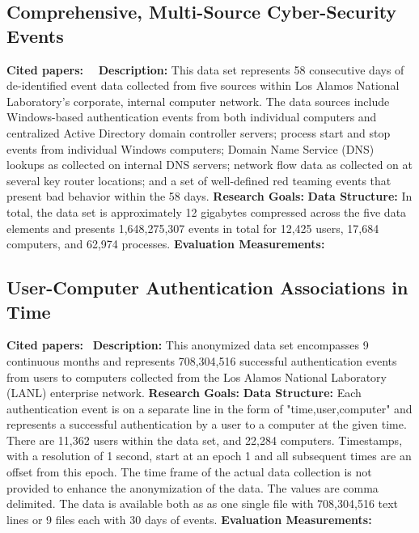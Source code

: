 \subsection{Comprehensive, Multi-Source Cyber-Security Events}
\textbf{Cited papers:}~\cite{akent-2015-enterprise-data}~\cite{pritom2017study} \newline
\textbf{Description:} This data set represents 58 consecutive days of de-identified event data collected from five sources within Los Alamos National Laboratory's corporate, internal computer network. The data sources include Windows-based authentication events from both individual computers and centralized Active Directory domain controller servers; process start and stop events from individual Windows computers; Domain Name Service (DNS) lookups as collected on internal DNS servers; network flow data as collected on at several key router locations; and a set of well-defined red teaming events that present bad behavior within the 58 days. \newline
\textbf{Research Goals:}  \newline
\textbf{Data Structure:} In total, the data set is approximately 12 gigabytes compressed across the five data elements and presents 1,648,275,307 events in total for 12,425 users, 17,684 computers, and 62,974 processes.\newline
\textbf{Evaluation Measurements:} \newline

\subsection{User-Computer Authentication Associations in Time}
\textbf{Cited papers:}~\cite{hagberg2014connected} \newline
\textbf{Description:} This anonymized data set encompasses 9 continuous months and represents 708,304,516 successful authentication events from users to computers collected from the Los Alamos National Laboratory (LANL) enterprise network. \newline
\textbf{Research Goals:}  \newline
\textbf{Data Structure:} Each authentication event is on a separate line in the form of "time,user,computer" and represents a successful authentication by a user to a computer at the given time. There are 11,362 users within the data set, and 22,284 computers. Timestamps, with a resolution of 1 second, start at an epoch 1 and all subsequent times are an offset from this epoch. The time frame of the actual data collection is not provided to enhance the anonymization of the data. The values are comma delimited.  The data is available both as as one single file with 708,304,516 text lines or 9 files each with 30 days of events. \newline
\textbf{Evaluation Measurements:} \newline

